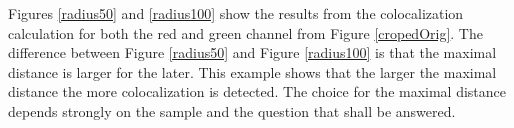 Figures \ref{radius50} and \ref{radius100} show the results from the colocalization calculation for both the red and green channel from Figure \ref{cropedOrig}. The difference between Figure \ref{radius50} and Figure \ref{radius100} is that the maximal distance is larger for the later. This example shows that the larger the maximal distance the more colocalization is detected. The choice for the maximal distance depends strongly on the sample and the question that shall be answered.






